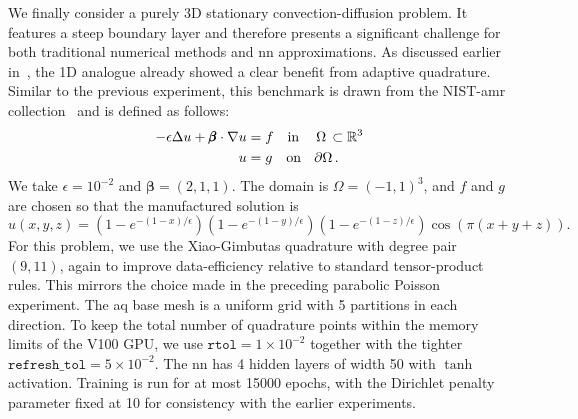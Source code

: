 \documentclass[oneside,reqno,11pt,a4paper]{amsart}
\theoremstyle{definition}
\begin{document}
We finally consider a purely 3D stationary convection-diffusion problem. It
features a steep boundary layer and therefore presents a significant challenge
for both traditional numerical methods and \ac{nn} approximations. As
discussed earlier in~, the 1D analogue already showed a
clear benefit from adaptive quadrature. Similar to the previous experiment,
this benchmark is drawn from the NIST-\ac{amr} collection~\cite{NISTAMR} and
is defined as follows:
\begin{align} \label{eq:adv-diff-3d-problem}
- \epsilon \Delta u + \pmb{\beta}\cdot \nabla u &= f \quad \text{in \;\; } \Omega\, \subset \mathbb{R}^3\\
u &= g \quad \text{on \; } \partial\Omega \,.
\end{align}
We take $\epsilon = 10^{-2}$ and $\pmb{\beta} = (2,1,1)$. The domain is
$\Omega = (-1,1)^3$, and $f$ and $g$ are chosen so that the manufactured
solution is
\begin{equation}
u(x,y,z) = \left(1 - e^{-(1-x)/\epsilon}\right) \left(1 - e^{-(1-y)/\epsilon}\right) \left(1 - e^{-(1-z)/\epsilon}\right) \cos\left(\pi\left(x + y + z\right)\right).
\end{equation}
For this problem, we use the Xiao-Gimbutas quadrature
\cite{XiaoGimbutas2010} with degree pair $(9,11)$, again to improve
data-efficiency relative to standard tensor-product rules. This mirrors the
choice made in the preceding parabolic Poisson experiment. The \ac{aq} base
mesh is a uniform grid with 5 partitions in each direction. To keep the total
number of quadrature points within the memory limits of the V100 GPU, we use
$\texttt{rtol} = 1 \times 10^{-2}$ together with the tighter
$\texttt{refresh\_tol} = 5 \times 10^{-2}$. The \ac{nn} has 4 hidden
layers of width 50 with $\tanh$ activation. Training is run for at most
\num{15000} epochs, with the Dirichlet penalty parameter fixed at 10 for
consistency with the earlier experiments.
\end{document}
